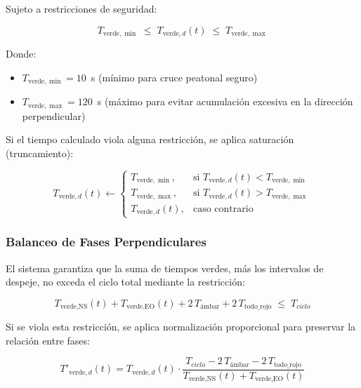\documentclass[12pt,a4paper,oneside]{report}
\begin{document}
Sujeto a restricciones de seguridad:

\begin{equation}
T_{\text{verde},\min} \;\leq\; T_{\text{verde},d}(t) \;\leq\; T_{\text{verde},\max}
\label{eq:tverde-restr}
\end{equation}

Donde:

\begin{itemize}
\item
  \(T_{\text{verde},\min} = 10\)~s (mínimo para cruce peatonal seguro)
\item
  \(T_{\text{verde},\max} = 120\)~s (máximo para evitar acumulación excesiva en la dirección perpendicular)
\end{itemize}

Si el tiempo calculado viola alguna restricción, se aplica saturación (truncamiento):

\begin{equation}
T_{\text{verde},d}(t) \leftarrow
\begin{cases}
T_{\text{verde},\min}, & \text{si } T_{\text{verde},d}(t) < T_{\text{verde},\min}\\[3pt]
T_{\text{verde},\max}, & \text{si } T_{\text{verde},d}(t) > T_{\text{verde},\max}\\[3pt]
T_{\text{verde},d}(t), & \text{caso contrario}
\end{cases}
\label{eq:saturacion}
\end{equation}

\subsubsection{Balanceo de Fases Perpendiculares}

El sistema garantiza que la suma de tiempos verdes, más los intervalos de despeje, no exceda el ciclo total mediante la restricción:

\begin{equation}
T_{\text{verde,NS}}(t) + T_{\text{verde,EO}}(t) + 2\,T_{\text{ámbar}} + 2\,T_{\text{todo\_rojo}} \;\leq\; T_{ciclo}
\label{eq:ciclo-restr}
\end{equation}

Si se viola esta restricción, se aplica normalización proporcional para preservar la relación entre fases:

\begin{equation}
T'_{\text{verde},d}(t) = T_{\text{verde},d}(t) \cdot \frac{T_{ciclo} - 2\,T_{\text{ámbar}} - 2\,T_{\text{todo\_rojo}}}{T_{\text{verde,NS}}(t) + T_{\text{verde,EO}}(t)}
\label{eq:balanceo}
\end{equation}
\end{document}
